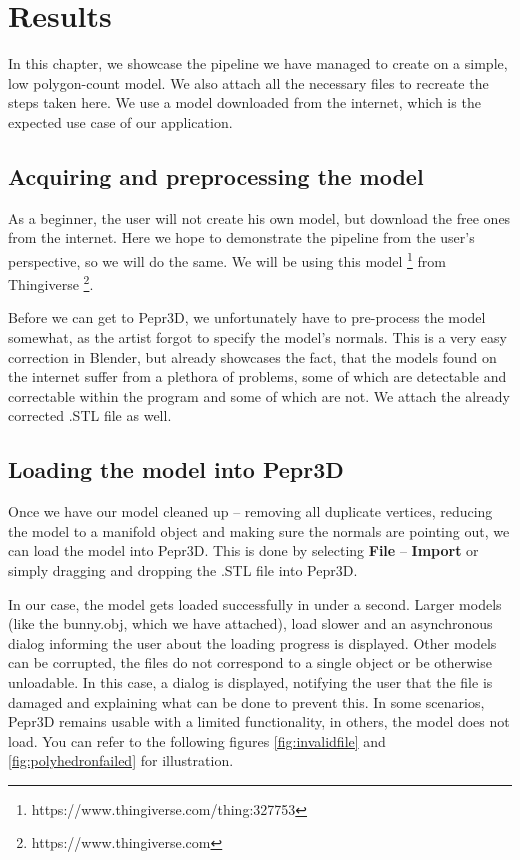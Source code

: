 \chapter{Results}
\label{ch:results}

In this chapter, we showcase the pipeline we have managed to create on a simple, low polygon-count model. We also attach all the necessary files to recreate the steps taken here. We use a model downloaded from the internet, which is the expected use case of our application.

\section{Acquiring and preprocessing the model}

As a beginner, the user will not create his own model, but download the free ones from the internet. Here we hope to demonstrate the pipeline from the user's perspective, so we will do the same. We will be using this model \footnote{https://www.thingiverse.com/thing:327753} from Thingiverse \footnote{https://www.thingiverse.com}.

Before we can get to Pepr3D, we unfortunately have to pre-process the model somewhat, as the artist forgot to specify the model's normals. This is a very easy correction in Blender, but already showcases the fact, that the models found on the internet suffer from a plethora of problems, some of which are detectable and correctable within the program and some of which are not. We attach the already corrected .STL file as well.

\section{Loading the model into Pepr3D}

Once we have our model cleaned up -- removing all duplicate vertices, reducing the model to a manifold object and making sure the normals are pointing out, we can load the model into Pepr3D. This is done by selecting \textbf{File} -- \textbf{Import} or simply dragging and dropping the .STL file into Pepr3D.

In our case, the model gets loaded successfully in under a second. Larger models (like the bunny.obj, which we have attached), load slower and an asynchronous dialog informing the user about the loading progress is displayed. Other models can be corrupted, the files do not correspond to a single object or be otherwise unloadable. In this case, a dialog is displayed, notifying the user that the file is damaged and explaining what can be done to prevent this. In some scenarios, Pepr3D remains usable with a limited functionality, in others, the model does not load. You can refer to the following figures \ref{fig:invalidfile} and \ref{fig:polyhedronfailed} for illustration.

